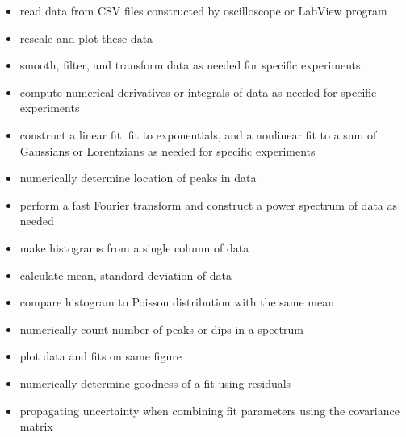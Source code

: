 \documentclass[graybox,envcountchap,sectrefs]{svmult}
\begin{document}
\begin{itemize}
\item read data from CSV files constructed by oscilloscope or LabView program

\item rescale and plot these data

\item smooth, filter, and transform data as needed for specific experiments

\item compute numerical derivatives or integrals of data as needed for specific experiments

\item construct a linear fit, fit to exponentials, and a nonlinear fit to a sum of Gaussians or Lorentzians as needed for specific experiments

\item numerically determine location of peaks in data

\item perform a fast Fourier transform and construct a power spectrum of data as needed

\item make histograms from a single column of data

\item calculate mean, standard deviation of data

\item compare histogram to Poisson distribution with the same mean

\item numerically count number of peaks or dips in a spectrum

\item plot data and fits on same figure

\item numerically determine goodness of a fit using residuals

\item propagating uncertainty when combining fit parameters using the covariance matrix
\end{itemize}
\end{document}
